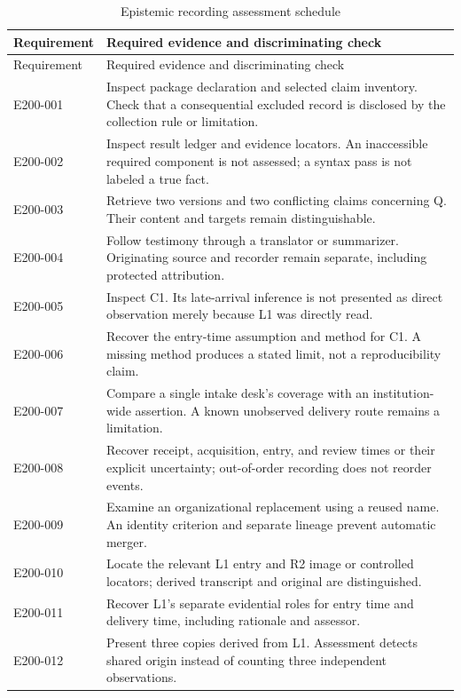 \documentclass[11pt,a4paper]{article}
\begin{document}
\begin{longtable}{@{}L{0.16\textwidth}L{0.74\textwidth}@{}}
\caption{Epistemic recording assessment schedule}\label{tab:gr200-checks}\\
\toprule
Requirement & Required evidence and discriminating check \\
\midrule\endfirsthead
\toprule
Requirement & Required evidence and discriminating check \\
\midrule\endhead
E200-001 & Inspect package declaration and selected claim inventory. Check that a consequential excluded record is disclosed by the collection rule or limitation. \\
E200-002 & Inspect result ledger and evidence locators. An inaccessible required component is not assessed; a syntax pass is not labeled a true fact. \\
E200-003 & Retrieve two versions and two conflicting claims concerning Q. Their content and targets remain distinguishable. \\
E200-004 & Follow testimony through a translator or summarizer. Originating source and recorder remain separate, including protected attribution. \\
E200-005 & Inspect C1. Its late-arrival inference is not presented as direct observation merely because L1 was directly read. \\
E200-006 & Recover the entry-time assumption and method for C1. A missing method produces a stated limit, not a reproducibility claim. \\
E200-007 & Compare a single intake desk's coverage with an institution-wide assertion. A known unobserved delivery route remains a limitation. \\
E200-008 & Recover receipt, acquisition, entry, and review times or their explicit uncertainty; out-of-order recording does not reorder events. \\
E200-009 & Examine an organizational replacement using a reused name. An identity criterion and separate lineage prevent automatic merger. \\
E200-010 & Locate the relevant L1 entry and R2 image or controlled locators; derived transcript and original are distinguished. \\
E200-011 & Recover L1's separate evidential roles for entry time and delivery time, including rationale and assessor. \\
E200-012 & Present three copies derived from L1. Assessment detects shared origin instead of counting three independent observations. \\

\end{longtable}
\end{document}
